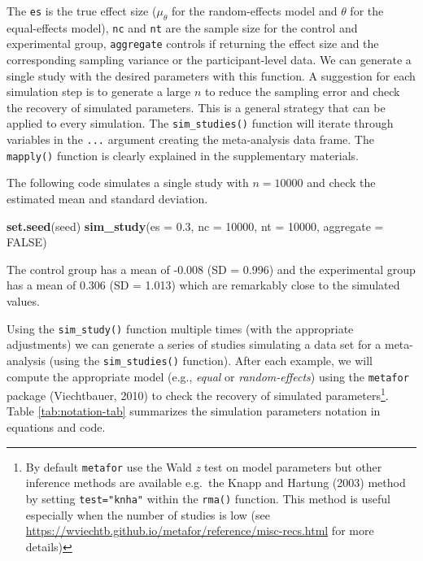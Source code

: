 \documentclass[
  man,floatsintext]{apa6}
\newenvironment{Shaded}{\begin{snugshade}}{\end{snugshade}}
\newcommand{\AttributeTok}[1]{\textcolor[rgb]{0.13,0.29,0.53}{#1}}
\newcommand{\ConstantTok}[1]{\textcolor[rgb]{0.56,0.35,0.01}{#1}}
\newcommand{\DecValTok}[1]{\textcolor[rgb]{0.00,0.00,0.81}{#1}}
\newcommand{\FloatTok}[1]{\textcolor[rgb]{0.00,0.00,0.81}{#1}}
\newcommand{\FunctionTok}[1]{\textcolor[rgb]{0.13,0.29,0.53}{\textbf{#1}}}
\newcommand{\NormalTok}[1]{#1}
\begin{document}
\normalsize

\color{red}

The \texttt{es} is the true effect size (\(\mu_{\theta}\) for the random-effects model and \(\theta\) for the equal-effects model), \texttt{nc} and \texttt{nt} are the sample size for the control and experimental group, \texttt{aggregate} controls if returning the effect size and the corresponding sampling variance or the participant-level data. We can generate a single study with the desired parameters with this function. A suggestion for each simulation step is to generate a large \(n\) to reduce the sampling error and check the recovery of simulated parameters. This is a general strategy that can be applied to every simulation. The \texttt{sim\_studies()} function will iterate through variables in the \texttt{...} argument creating the meta-analysis data frame. The \texttt{mapply()} function is clearly explained in the supplementary materials. \color{black}

The following code simulates a single study with \(n = 10000\) and check the estimated mean and standard deviation.

\scriptsize

\begin{Shaded}
\begin{Highlighting}[]
\FunctionTok{set.seed}\NormalTok{(seed)}
\FunctionTok{sim\_study}\NormalTok{(}\AttributeTok{es =} \FloatTok{0.3}\NormalTok{, }\AttributeTok{nc =} \DecValTok{10000}\NormalTok{, }\AttributeTok{nt =} \DecValTok{10000}\NormalTok{, }\AttributeTok{aggregate =} \ConstantTok{FALSE}\NormalTok{)}
\end{Highlighting}
\end{Shaded}

\normalsize

\scriptsize

\normalsize

The control group has a mean of -0.008 (SD = 0.996) and the experimental group has a mean of 0.306 (SD = 1.013) which are remarkably close to the simulated values.

Using the \texttt{sim\_study()} function multiple times (with the appropriate adjustments) we can generate a series of studies simulating a data set for a meta-analysis (using the \texttt{sim\_studies()} function). After each example, we will compute the appropriate model (e.g., \emph{equal} or \emph{random-effects}) using the \texttt{metafor} package (Viechtbauer, 2010) to check the recovery of simulated parameters\footnote{\color{red} By default \texttt{metafor} use the Wald \emph{z} test on model parameters but other inference methods are available e.g.~the Knapp and Hartung (2003) method by setting \texttt{test="knha"} within the \texttt{rma()} function. This method is useful especially when the number of studies is low (see \url{https://wviechtb.github.io/metafor/reference/misc-recs.html} for more details) \color{black}}. Table \ref{tab:notation-tab} summarizes the simulation parameters notation in equations and code.
\end{document}
